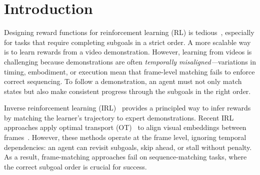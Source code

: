 \section{Introduction}

Designing reward functions for reinforcement learning (RL) is tedious~\cite{eschmann2021reward}, especially for tasks that require completing subgoals in a strict order. A more scalable way is to learn rewards from a video demonstration. However, learning from videos is challenging because demonstrations are often \emph{temporally misaligned—}variations in timing, embodiment, or execution mean that frame-level matching fails to enforce correct sequencing. To follow a demonstration, an agent must not only match states but also make consistent progress through the subgoals in the right order.




Inverse reinforcement learning (IRL)~\citep{abbeel2004apprenticeship, ziebart2008maximum} provides a principled way to infer rewards by matching the learner’s trajectory to expert demonstrations. 
Recent IRL approaches apply optimal transport (OT)~\cite{peyré2020computationaloptimaltransport} to align visual embeddings between frames~\cite{cohen2022imitation, haldar2023teach, haldar2023watch, guzey2024see, tian2024what, liu2024imitation, fu2024robot}. 
However, these methods operate at the frame level, ignoring temporal dependencies: an agent can revisit subgoals, skip ahead, or stall without penalty. As a result, frame-matching approaches fail on sequence-matching tasks, where the correct subgoal order is crucial for success.

